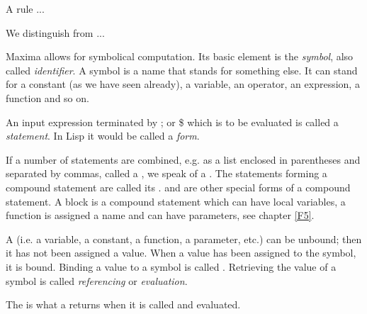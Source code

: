 \documentclass[../Maxima_Workbook.tex]{subfiles}
\begin{document}
\lzz {} 

\lz A rule ...

\lzz {} 

\lzz  We distinguish  from ... 

\lzz {}  

\lz Maxima allows for symbolical computation. Its basic element is the \emph{symbol}, also called \emph{identifier}. A symbol is a name that stands for something else. It can stand for a constant (as we have seen already), a variable, an operator, an expression, a function and so on.

\lzz {} 

\lz An input expression terminated by ; or \$ which is to be evaluated is called a \emph{statement}. In Lisp it would be called a \emph{form}.

\lz If a number of statements are combined, e.g. as a list enclosed in parentheses and separated by commas, called a , we speak of a .  The statements forming a compound statement are called its .  and  are other special forms of a compound statement. A block is a compound statement which can have local variables, a function is assigned a name and can have parameters, see chapter \ref{F5}.

\lzz {} 

\lz A  (i.e. a variable, a constant, a function, a parameter, etc.) can be unbound; then it has not been assigned a value. When a value has been assigned to the symbol, it is bound. Binding a value to a symbol is called . Retrieving the value of a symbol is called \emph{referencing} or \emph{evaluation}.

\lz The   is what a  returns when it is called and evaluated.

\lzz {} 
\end{document}

